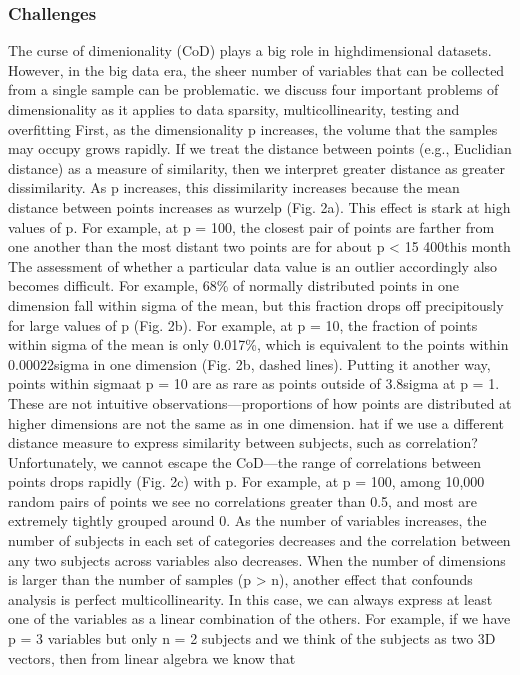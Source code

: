 \subsubsection*{Challenges}
The curse of dimenionality (CoD) plays a big role in highdimensional datasets.
However, in the big data era, the sheer number of variables that can be collected from a single sample can be
problematic. we discuss four important problems of dimensionality as it applies to data sparsity, multicollinearity, testing and overfitting
First, as the dimensionality p increases, the volume that the samples may occupy grows rapidly. If we treat the distance between points
(e.g., Euclidian distance) as a measure of similarity, then we interpret greater distance as greater dissimilarity. As p increases, this
dissimilarity increases because the mean distance between points increases as wurzelp (Fig. 2a). This effect is stark at high values of
p. For example, at p = 100, the closest pair of points are farther from one another than the most distant two points are for about p < 15
400this month The assessment of whether a particular data value is an outlier accordingly also becomes difficult. For example, 68\% of normally
distributed points in one dimension fall within sigma of the mean, but this fraction drops off precipitously for large values of p (Fig. 2b).
For example, at p = 10, the fraction of points within sigma of the mean is only 0.017\%, which is equivalent to the points within 0.00022sigma in
one dimension (Fig. 2b, dashed lines). Putting it another way, points within sigmaat p = 10 are as rare as points outside of 3.8sigma at p = 1. 
These are not intuitive observations—proportions of how points are distributed at higher dimensions are not the same as in one dimension.
hat if we use a different distance measure to express similarity between subjects, such as correlation? Unfortunately, we cannot escape the CoD—the range of
correlations between points drops rapidly (Fig. 2c) with p. For example, at p = 100, among 10,000 random pairs of points we see no correlations greater than 0.5, and most
are extremely tightly grouped around 0. As the number of variables increases, the number of subjects in each set of categories decreases and the
correlation between any two subjects across variables also decreases.
When the number of dimensions is larger than the number of samples (p > n), another effect that confounds analysis is perfect multicollinearity.
In this case, we can always express at least one of the variables as a linear combination of the others. For example, if we
have p = 3 variables but only n = 2 subjects and we think of the subjects as two 3D vectors, then from linear algebra we know that
